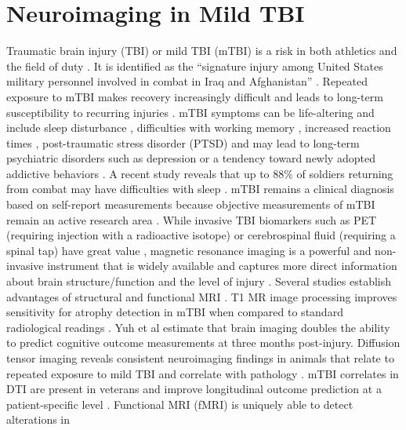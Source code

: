 
\section{Neuroimaging in Mild TBI}
Traumatic brain injury (TBI) or mild TBI (mTBI) is a risk in both athletics and the
field of duty
\cite{Toblin2012,Peskind2013,Small2013,Kontos2013,Gosselin2012,Zuckerman2012}.
It is identified as the ``signature injury among United States
military personnel involved in combat in Iraq and Afghanistan''
\cite{McCrea2008,Rigg2011}.  
Repeated exposure to mTBI makes recovery increasingly difficult and
leads to long-term susceptibility to recurring injuries
\cite{Shively2012}.  %
mTBI symptoms can be life-altering and
include sleep disturbance \cite{Mysliwiec2013}, difficulties with
working memory \cite{Bryer2013}, increased reaction times
\cite{Luethcke2011}, post-traumatic stress disorder (PTSD)
\cite{Toblin2012,Bazarian2013} and may
lead to long-term psychiatric disorders such as depression
\cite{Mayer2011,Rapp2012,Toblin2012} or a tendency toward newly adopted addictive
behaviors \cite{Miller2013}.  A recent study reveals that up
to 88\% of soldiers returning from combat may have difficulties with sleep
\cite{Mysliwiec2013}.  %
mTBI remains a clinical diagnosis \cite{MacDonald2011} based on self-report measurements
because objective measurements of mTBI remain an active research area \cite{Rapp2012}.
While invasive TBI biomarkers such as PET (requiring injection with a
radioactive isotope) \cite{Small2013} or cerebrospinal fluid
(requiring a spinal tap) have great value \cite{Zetterberg2013}, magnetic resonance imaging
is a powerful and non-invasive instrument that is widely available and captures more direct
information about brain structure/function and the level of injury
\cite{Fox2013}.  Several studies establish advantages of structural
and functional MRI \cite{Ross2013,Yuh2013,Mayer2011,Morey2012}.
T1 MR image processing improves sensitivity for
atrophy detection in mTBI when compared to standard radiological readings \cite{Ross2013}.  Yuh et al \cite{Yuh2013}
estimate that brain imaging doubles the ability to predict cognitive
outcome measurements at three months post-injury.  Diffusion tensor
imaging reveals consistent neuroimaging findings in animals that
relate to repeated exposure to mild TBI and correlate with pathology
\cite{Bennett2012}.  mTBI correlates in DTI are present in veterans
\cite{Morey2012,Jorge2012} and improve longitudinal outcome prediction
at a patient-specific level \cite{Sidaros2008}.  Functional MRI (fMRI) is uniquely able to detect alterations in

